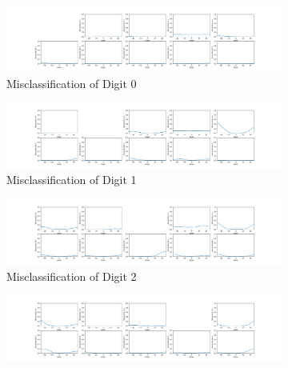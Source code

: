 \clearpage
\begin{figure}[htb!]
    \centering
    \begin{subfigure}[b]{\textwidth}
        \centering
        \includegraphics[width=\textwidth]{chapters/results/CNN/Rotate/acc1.png}
        \caption{Misclassification of Digit 0}
        \label{fig:Rotate-misclass0}
    \end{subfigure}
    \begin{subfigure}[b]{\textwidth}
        \centering
        \includegraphics[width=\textwidth]{chapters/results/CNN/Rotate/acc2.png}
        \caption{Misclassification of Digit 1}
        \label{fig:Rotate-misclass0}
    \end{subfigure}
    \begin{subfigure}[b]{\textwidth}
        \centering
        \includegraphics[width=\textwidth]{chapters/results/CNN/Rotate/acc3.png}
        \caption{Misclassification of Digit 2}
        \label{fig:Rotate-misclass0}
    \end{subfigure}
    \begin{subfigure}[b]{\textwidth}
        \centering
        \includegraphics[width=\textwidth]{chapters/results/CNN/Rotate/acc4.png}

\end{subfigure}
\end{figure}
